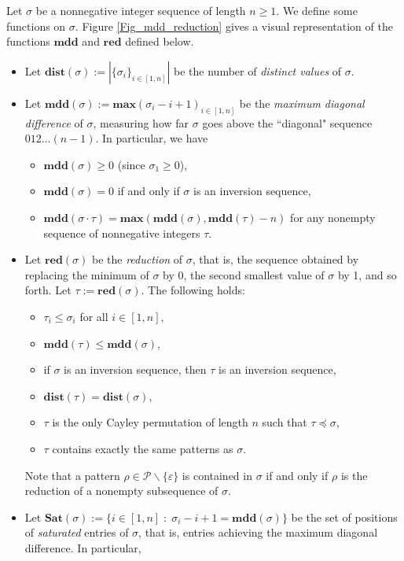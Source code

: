 \documentclass[a4paper,11pt]{article}
\theoremstyle{definition}
\theoremstyle{remark}
\renewcommand{\P}{\mathcal{P}}
\renewcommand{\max}{\mathbf{max}}
\newcommand{\mdd}{\mathbf{mdd}}
\newcommand{\Sat}{\mathbf{Sat}}
\newcommand{\dist}{\mathbf{dist}}
\newcommand{\red}{\mathbf{red}}
\begin{document}
Let $\sigma$ be a nonnegative integer sequence of length $n \geq 1$. We define some functions on $\sigma$. Figure \ref{Fig_mdd_reduction} gives a visual representation of the functions $\mdd$ and $\red$ defined below.
\begin{itemize}
    \item Let $\dist(\sigma) := |\{\sigma_i\}_{i \in [1,n]}|$ be the number of \emph{distinct values} of $\sigma$.
    \item Let $\mdd(\sigma) := \max(\sigma_i - i + 1)_{i \in [1,n]}$ be the \emph{maximum diagonal difference} of $\sigma$, measuring how far $\sigma$ goes above the ``diagonal" sequence ${012\dots(n-1)}$. In particular, we have
    \begin{itemize}
        \item $\mdd(\sigma) \geq 0$ (since $\sigma_1 \geq 0$),
        \item $\mdd(\sigma) = 0$ if and only if $\sigma$ is an inversion sequence,
        \item $\mdd(\sigma \cdot \tau) = \max(\mdd(\sigma), \mdd(\tau) - n)$ for any nonempty sequence of nonnegative integers $\tau$.
    \end{itemize}
    \item Let $\red(\sigma)$ be the \emph{reduction} of $\sigma$, that is, the sequence obtained by replacing the minimum of $\sigma$ by 0, the second smallest value of $\sigma$ by 1, and so forth. Let ${\tau := \red(\sigma)}$. The following holds:
    \begin{itemize}
        \item $\tau_i \leq \sigma_i$ for all $i \in [1,n]$,
        \item $\mdd(\tau) \leq \mdd(\sigma)$,
        \item if $\sigma$ is an inversion sequence, then $\tau$ is an inversion sequence,
        \item $\dist(\tau) = \dist(\sigma)$,
        \item $\tau$ is the only Cayley permutation of length $n$ such that $\tau \preceq \sigma$,
        \item $\tau$ contains exactly the same patterns as $\sigma$.
    \end{itemize}
    Note that a pattern $\rho \in \P \backslash \{\varepsilon\}$ is contained in $\sigma$ if and only if $\rho$ is the reduction of a nonempty subsequence of $\sigma$.
    \item Let $\Sat(\sigma) := \{i \in [1,n] \; : \; \sigma_i - i + 1 = \mdd(\sigma)\}$ be the set of positions of \emph{saturated} entries of $\sigma$, that is, entries achieving the maximum diagonal difference. In particular,

\end{itemize}
\end{document}
